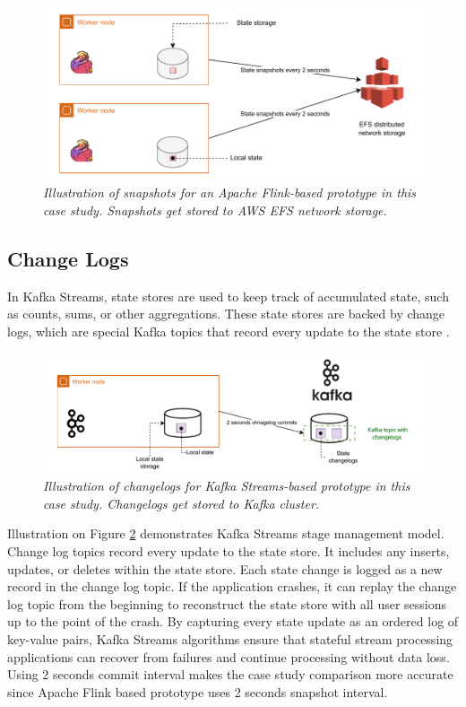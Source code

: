 \begin{figure}[H]
    \centering
    \includegraphics[width=1\textwidth]{figures/flink-snapshots}
    \caption{\textit{Illustration of snapshots for an Apache Flink-based prototype in this case study.
    Snapshots get stored to AWS EFS network storage.}}
    \label{fig:flink-snapshots}
\end{figure}



\subsection{Change Logs}\label{subsec:change-logs}
In Kafka Streams, state stores are used to keep track of accumulated state, such as counts, sums, or other aggregations.
These state stores are backed by change logs, which are special Kafka topics that record every update to the state store \cite{kafka_streams_intro}.

\begin{figure}[H]
    \centering
    \includegraphics[width=1\textwidth]{figures/kafka-changelogs}
    \caption{\textit{Illustration of changelogs for Kafka Streams-based prototype in this case study.
    Changelogs get stored to Kafka cluster.}}
    \label{fig:kafka-snapshots}
\end{figure}

Illustration on Figure \ref{fig:kafka-snapshots} demonstrates Kafka Streams
stage management model.
Change log topics record every update to the state store.
It includes any inserts, updates, or deletes within the state store.
Each state change is logged as a new record in the change log topic.
If the application crashes, it can replay the change log topic from the beginning to reconstruct
the state store with all user sessions up to the point of the crash.
By capturing every state update as an ordered log of key-value pairs,
Kafka Streams algorithms ensure that stateful stream processing applications can recover
from failures and continue processing without data loss.
Using 2 seconds commit interval makes the case study comparison more accurate since
Apache Flink based prototype uses 2 seconds snapshot interval.

